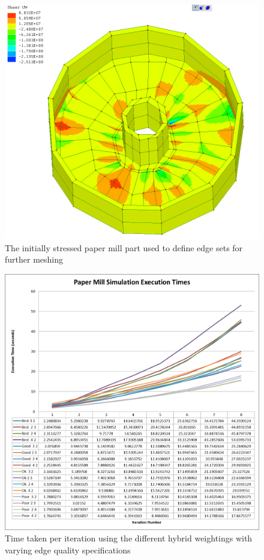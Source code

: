  \begin{figure}[H]
  \centerline{\includegraphics[width=120mm, scale=0.5]{../Graphics/PaperMillStress/PaperMillFirstUWMesh.png}}
  \caption{The initially stressed paper mill part used to define edge sets for further meshing}
\end{figure}


 \begin{figure}[H]
  \centerline{\includegraphics[width=120mm, scale=0.5]{../Graphics/Graphs/PaperMillExecutionTimes.png}}
  \caption{Time taken per iteration using the different hybrid weightings with varying edge quality specifications}
\end{figure}

